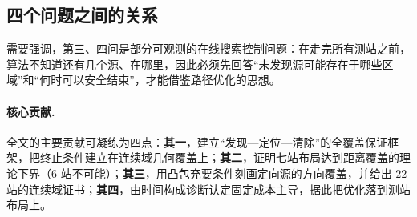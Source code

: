 \subsection{四个问题之间的关系}

需要强调，第三、四问是部分可观测的在线搜索控制问题：在走完所有测站之前，算法不知道还有几个源、在哪里，因此必须先回答“未发现源可能存在于哪些区域”和“何时可以安全结束”，才能借鉴路径优化的思想。

\paragraph{核心贡献.} 全文的主要贡献可凝练为四点：\textbf{其一}，建立“发现—定位—清除”的全覆盖保证框架，把终止条件建立在连续域几何覆盖上；\textbf{其二}，证明七站布局达到距离覆盖的理论下界（$6$ 站不可能）；\textbf{其三}，用凸包充要条件刻画定向源的方向覆盖，并给出 $22$ 站的连续域证书；\textbf{其四}，由时间构成诊断认定固定成本主导，据此把优化落到测站布局上。